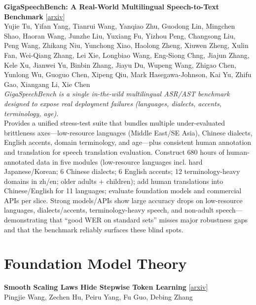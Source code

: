 \documentclass[12pt,letterpaper]{article}
\begin{document}
\medskip

{\small\textbf{GigaSpeechBench: A Real-World Multilingual Speech-to-Text Benchmark}} {\scriptsize[\href{https://arxiv.org/abs/2606.28884}{arxiv}]}\\
{\scriptsize Yujie Tu, Yifan Yang, Tianrui Wang, Yanqiao Zhu, Guodong Lin, Mingchen Shao, Haoran Wang, Junzhe Liu, Yuxiang Fu, Yizhou Peng, Changsong Liu, Peng Wang, Zhikang Niu, Yunchong Xiao, Haolong Zheng, Xiuwen Zheng, Xulin Fan, Wei-Qiang Zhang, Lei Xie, Longbiao Wang, Eng-Siong Chng, Jiajun Zhang, Kele Xu, Jianwei Yu, Binbin Zhang, Jiayu Du, Wupeng Wang, Zhigao Chen, Yunlong Wu, Guoguo Chen, Xipeng Qiu, Mark Hasegawa-Johnson, Kai Yu, Zhifu Gao, Xiangang Li, Xie Chen}\\

{\small\textit{GigaSpeechBench is a single in-the-wild multilingual ASR/AST benchmark designed to expose real deployment failures (languages, dialects, accents, terminology, age).}}\\[1pt]
{\footnotesize Provides a unified stress-test suite that bundles multiple under-evaluated brittleness axes---low-resource languages (Middle East/SE Asia), Chinese dialects, English accents, domain terminology, and age---plus consistent human annotation and translation for speech translation evaluation. Construct 680 hours of human-annotated data in five modules (low-resource languages incl. hard Japanese/Korean; 6 Chinese dialects; 6 English accents; 12 terminology-heavy domains in zh/en; older adults + children); add human translations into Chinese/English for 11 languages; evaluate foundation models and commercial APIs per slice. Strong models/APIs show large accuracy drops on low-resource languages, dialects/accents, terminology-heavy speech, and non-adult speech---demonstrating that ``good WER on standard sets'' misses major robustness gaps and that the benchmark reliably surfaces these blind spots.}

\medskip


\section*{Foundation Model Theory}

{\small\textbf{Smooth Scaling Laws Hide Stepwise Token Learning}} {\scriptsize[\href{https://arxiv.org/abs/2606.29858}{arxiv}]}\\
{\scriptsize Pingjie Wang, Zechen Hu, Peiru Yang, Fu Guo, Debing Zhang}\\
\end{document}
